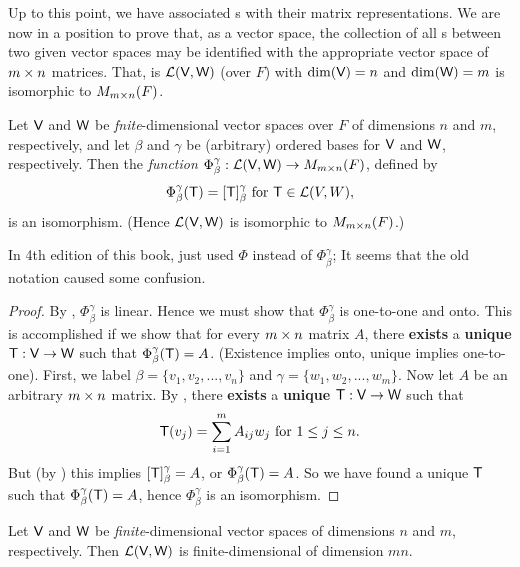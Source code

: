 Up to this point, we have associated \LTRAN{}s with their matrix representations.
We are now in a position to prove that, as a vector space, the collection of all \LTRAN{}s between two given vector
spaces may be identified with the appropriate vector space of \(m \times n\) matrices.
That, is \(\mathcal{L}(\textsf{V}, \textsf{W})\) (over \(F\)) with \(\dim(\textsf{V}) = n\) and \(\dim(\textsf{W}) = m\) is isomorphic to \(M_{m \times n}(F)\).

\begin{theorem} \label{thm 2.20}
Let \(\textsf{V}\) and \(\textsf{W}\) be \emph{fnite}-dimensional vector spaces over \(F\) of dimensions \(n\) and \(m\), respectively,
and let \(\beta\) and \(\gamma\) be (arbitrary) ordered bases for \(\textsf{V}\) and \(\textsf{W}\), respectively.
Then the \emph{function} \(\Phi_{\beta}^{\gamma}: \mathcal{L}(\textsf{V}, \textsf{W}) \to M_{m \times n}(F)\), defined by
\[
    \Phi_{\beta}^{\gamma}(\textsf{T}) = [\textsf{T}]_{\beta}^{\gamma} \text{ for } \textsf{T} \in \mathcal{L}(V, W),
\]
is an isomorphism.
(Hence \(\mathcal{L}(\textsf{V}, \textsf{W})\) is isomorphic to \(M_{m \times n}(F)\).)
\end{theorem}

\begin{note}
In 4th edition of this book,  just used \(\Phi\) instead of \(\Phi_{\beta}^{\gamma}\);
It seems that the old notation caused some confusion.
\end{note}

\begin{proof}
By , \(\Phi_{\beta}^{\gamma}\) is linear.
Hence we must show that \(\Phi_{\beta}^{\gamma}\) is one-to-one and onto.
This is accomplished if we show that for every \(m \times n\) matrix \(A\), there \textbf{exists} a \textbf{unique} \LTRAN{} \(\textsf{T} : \textsf{V} \to \textsf{W}\) such that \(\Phi_{\beta}^{\gamma}(\textsf{T}) = A\).
(Existence implies onto, unique implies one-to-one).
First, we label \(\beta = \{ v_1, v_2, ..., v_n \}\) and \(\gamma = \{ w_1, w_2, ..., w_m \}\).
Now let \(A\) be an arbitrary \(m \times n\) matrix.
By , there \textbf{exists} a \textbf{unique} \LTRAN{} \(\textsf{T}: \textsf{V} \to \textsf{W}\) such that
\[
    \textsf{T}(v_j) = \sum_{i = 1}^{m} A_{ij} w_j \text{ for } 1 \le j \le n.
\]
But (by ) this implies \([\textsf{T}]_{\beta}^{\gamma} = A\), or \(\Phi_{\beta}^{\gamma}(\textsf{T}) = A\).
So we have found a unique \(\textsf{T}\) such that \(\Phi_{\beta}^{\gamma}(\textsf{T}) = A\), hence \(\Phi_{\beta}^{\gamma}\) is an isomorphism.
\end{proof}

\begin{corollary} \label{corollary 2.20.1}
Let \(\textsf{V}\) and \(\textsf{W}\) be \emph{finite}-dimensional vector spaces of dimensions \(n\) and \(m\), respectively.
Then \(\mathcal{L}(\textsf{V}, \textsf{W})\) is finite-dimensional of dimension \(mn\).
\end{corollary}


